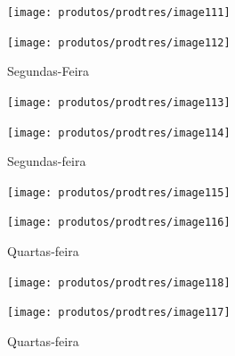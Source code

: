 \begin{landscape}
	
	\begin{figure}[h]
		\centering
		\caption*{Segundas-Feira}
		\begin{minipage}{1.3\textwidth}
			\centering
			\label{fig:image111}
			\texttt{[image: produtos/prodtres/image111]}
		\end{minipage}
		\begin{minipage}{1.3\textwidth}
			\centering
			\texttt{[image: produtos/prodtres/image112]}
			\label{fig:image112}
		\end{minipage}
	\end{figure}
	
		\begin{figure}[h]
		\centering
		\caption*{Segundas-feira}
		\begin{minipage}{1.4\textwidth}
			\centering
			\label{fig:image113}
			\texttt{[image: produtos/prodtres/image113]}
		\end{minipage}
		\begin{minipage}{1.4\textwidth}
			\centering
			\texttt{[image: produtos/prodtres/image114]}
			\label{fig:image114}
		\end{minipage}
	\end{figure}

\end{landscape}

\FloatBarrier


\begin{landscape}
	
	\begin{figure}[h]
		\centering
		\caption*{Quartas-feira}
		\begin{minipage}{1.4\textwidth}
			\centering
			\label{fig:image115}
			\texttt{[image: produtos/prodtres/image115]}
		\end{minipage}
		\begin{minipage}{1.4\textwidth}
			\centering
			\texttt{[image: produtos/prodtres/image116]}
			\label{fig:image116}
		\end{minipage}
	\end{figure}
	
	\begin{figure}[h]
		\centering
		\caption*{Quartas-feira}
		\begin{minipage}{1.4\textwidth}
			\centering
			\label{fig:image118}
			\texttt{[image: produtos/prodtres/image118]}
		\end{minipage}
		\begin{minipage}{1.4\textwidth}
			\centering
			\texttt{[image: produtos/prodtres/image117]}
			\label{fig:image117}
		\end{minipage}
	\end{figure}
	
\end{landscape}

